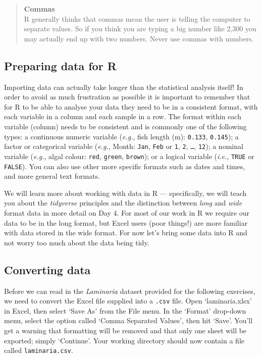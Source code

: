\documentclass[]{book}
\theoremstyle{definition}
\theoremstyle{definition}
\theoremstyle{definition}
\theoremstyle{remark}
\begin{document}
\begin{quote}
\textbf{Commas}\\
R generally thinks that commas mean the user is telling the computer to
separate values. So if you think you are typing a big number like 2,300
you may actually end up with two numbers. Never use commas with numbers.
\end{quote}

\subsection{Preparing data for R}\label{preparing-data-for-r}

Importing data can actually take longer than the statistical analysis
itself! In order to avoid as much frustration as possible it is
important to remember that for R to be able to analyse your data they
need to be in a consistent format, with each variable in a column and
each sample in a row. The format within each variable (column) needs to
be consistent and is commonly one of the following types: a continuous
numeric variable (\emph{e.g.}, fish length (m): \texttt{0.133},
\texttt{0.145}); a factor or categorical variable (\emph{e.g.}, Month:
\texttt{Jan}, \texttt{Feb} or \texttt{1}, \texttt{2}, \texttt{\ldots{}},
\texttt{12}); a nominal variable (\emph{e.g.}, algal colour:
\texttt{red}, \texttt{green}, \texttt{brown}); or a logical variable
(\emph{i.e.}, \texttt{TRUE} or \texttt{FALSE}). You can also use other
more specific formats such as dates and times, and more general text
formats.

We will learn more about working with data in R --- specifically, we
will teach you about the \emph{tidyverse} principles and the distinction
between \emph{long} and \emph{wide} format data in more detail on Day 4.
For most of our work in R we require our data to be in the long format,
but Excel users (poor things!) are more familiar with data stored in the
wide format. For now let's bring some data into R and not worry too much
about the data being tidy.

\subsection{Converting data}\label{converting-data}

Before we can read in the \emph{Laminaria} dataset provided for the
following exercises, we need to convert the Excel file supplied into a
\texttt{.csv} file. Open `laminaria.xlsx' in Excel, then select `Save
As' from the File menu. In the `Format' drop-down menu, select the
option called `Comma Separated Values', then hit `Save'. You'll get a
warning that formatting will be removed and that only one sheet will be
exported; simply `Continue'. Your working directory should now contain a
file called \texttt{laminaria.csv}.
\end{document}
